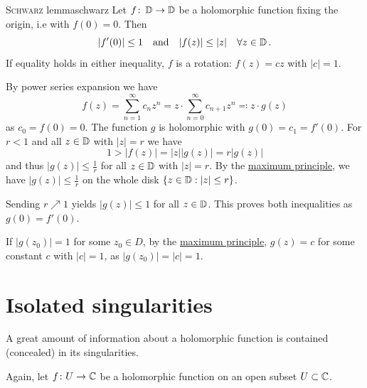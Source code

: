 \documentclass[a4paper,english]{article}
\begin{document}
\begin{thm}{\textsc{Schwarz} lemma}{schwarz}
    Let $f\colon \operatorname{\mathbb{D}} \to \operatorname{\mathbb{D}}$ be a holomorphic function fixing the origin, i.e with $f(0) = 0$.
    Then
    \begin{equation*}
        | f'(0) | \le 1
        \quad \text{and} \quad
        | f(z) | \le | z | \quad
        \forall z \in \operatorname{\mathbb{D}}.
    \end{equation*}
    If equality holds in either inequality, $f$ is a rotation: $f(z) = c z$ with $| c | = 1$.
\end{thm}

\begin{pr}
    By power series expansion we have
    \begin{equation*}
        f(z)
        = \sum_{n = 1}^{\infty} c_n z^n
        = z \cdot \sum_{n = 0}^{\infty} c_{n + 1} z^n
        \eqqcolon z \cdot g(z)
    \end{equation*}
    as $c_0 = f(0) = 0$.
    The function $g$ is holomorphic with $g(0) = c_1 = f'(0)$.
    For $r < 1$ and all $z \in \operatorname{\mathbb{D}}$ with $| z | = r$ we have
    \begin{equation*}
        1
        > | f(z) |
        = | z | | g(z) |
        = r | g(z) |
    \end{equation*}
    and thus $| g(z) | \le \frac{1}{r}$ for all $z \in \operatorname{\mathbb{D}}$ with $| z | = r$.
    By the \hyperref[th:maxp1]{maximum principle}, we have $| g(z) | \le \frac{1}{r}$ on the whole disk $\{ z \in \operatorname{\mathbb{D}}: | z | \le r \}$.
    
    Sending $r \nearrow 1$ yields $| g(z) | \le 1$ for all $z \in \operatorname{\mathbb{D}}$.
    This proves both inequalities as $g(0) = f'(0)$.
    
    If $| g(z_0) | = 1$  for some $z_0 \in D$, by the \hyperref[th:maxp1]{maximum principle}, $g(z) = c$ for some constant $c$ with $| c | = 1$, as $| g(z_0) | = | c | = 1$.
\end{pr}

\section{Isolated singularities}

A great amount of information about a holomorphic function is contained (concealed) in its singularities.
    
Again, let $f\colon U \to \operatorname{\mathbb{C}}$ be a holomorphic function on an open subset $U \subset \operatorname{\mathbb{C}}$.
\end{document}
